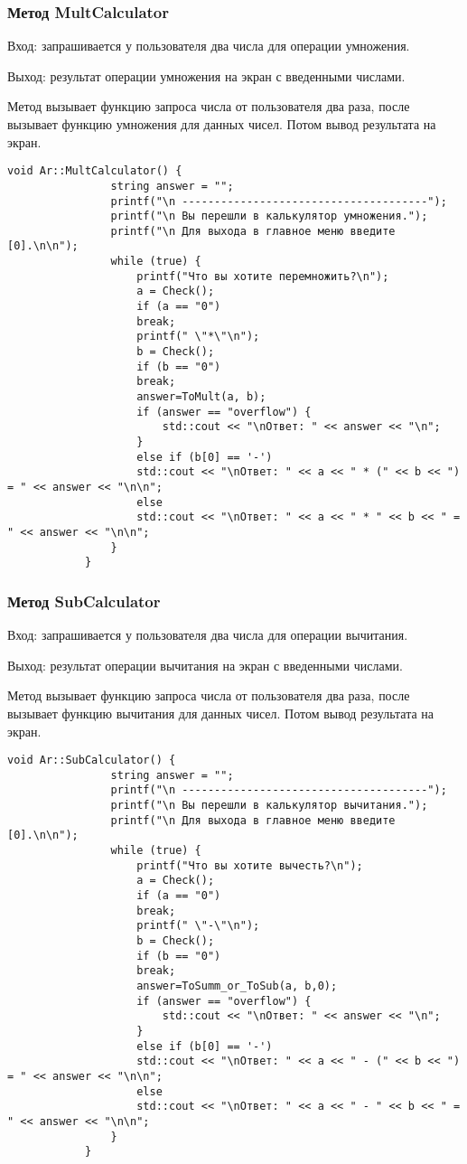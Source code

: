 \documentclass[10pt,a4paper,final]{article} %
\begin{document}
			\subsubsection{Метод MultCalculator}
		
		Вход: запрашивается у пользователя два числа для операции умножения. 
		
		Выход: результат операции умножения на экран с введенными числами.
		
		Метод вызывает функцию запроса числа от пользователя два раза, после вызывает функцию умножения для данных чисел. Потом вывод результата на экран.  
		\begin{lstlisting}[caption={Метод MultCalculator}]
			void Ar::MultCalculator() {
				string answer = "";
				printf("\n --------------------------------------");
				printf("\n Вы перешли в калькулятор умножения.");
				printf("\n Для выхода в главное меню введите [0].\n\n");
				while (true) {
					printf("Что вы хотите перемножить?\n");
					a = Check();
					if (a == "0")
					break;
					printf(" \"*\"\n");
					b = Check();
					if (b == "0")
					break;
					answer=ToMult(a, b);
					if (answer == "overflow") {
						std::cout << "\nОтвет: " << answer << "\n";
					}
					else if (b[0] == '-')
					std::cout << "\nОтвет: " << a << " * (" << b << ") = " << answer << "\n\n";
					else
					std::cout << "\nОтвет: " << a << " * " << b << " = " << answer << "\n\n";
				}
			}
		\end{lstlisting}
		
		\subsubsection{Метод SubCalculator}
			Вход: запрашивается у пользователя два числа для операции вычитания. 
		
		Выход: результат операции вычитания на экран с введенными числами.
		
		Метод вызывает функцию запроса числа от пользователя два раза, после вызывает функцию вычитания для данных чисел. Потом вывод результата на экран.  
		\begin{lstlisting}[caption={Метод SubCalculator}]
			void Ar::SubCalculator() {
				string answer = "";
				printf("\n --------------------------------------");
				printf("\n Вы перешли в калькулятор вычитания.");
				printf("\n Для выхода в главное меню введите [0].\n\n");
				while (true) {
					printf("Что вы хотите вычесть?\n");
					a = Check();
					if (a == "0")
					break;
					printf(" \"-\"\n");
					b = Check();
					if (b == "0")
					break;
					answer=ToSumm_or_ToSub(a, b,0);
					if (answer == "overflow") {
						std::cout << "\nОтвет: " << answer << "\n";
					}
					else if (b[0] == '-')
					std::cout << "\nОтвет: " << a << " - (" << b << ") = " << answer << "\n\n";
					else
					std::cout << "\nОтвет: " << a << " - " << b << " = " << answer << "\n\n";
				}
			}
		\end{lstlisting}
		
\end{document}
